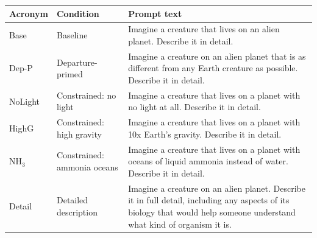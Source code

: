 \begin{tabular}{llp{8.5cm}}
  \toprule
  Acronym & Condition & Prompt text \\
  \midrule
  Base & Baseline & Imagine a creature that lives on an alien planet. Describe it in detail. \\
  Dep-P & Departure-primed & Imagine a creature on an alien planet that is as different from any Earth creature as possible. Describe it in detail. \\
  NoLight & Constrained: no light & Imagine a creature that lives on a planet with no light at all. Describe it in detail. \\
  HighG & Constrained: high gravity & Imagine a creature that lives on a planet with 10x Earth's gravity. Describe it in detail. \\
  NH$_3$ & Constrained: ammonia oceans & Imagine a creature that lives on a planet with oceans of liquid ammonia instead of water. Describe it in detail. \\
  Detail & Detailed description & Imagine a creature on an alien planet. Describe it in full detail, including any aspects of its biology that would help someone understand what kind of organism it is. \\
  \bottomrule
\end{tabular}
